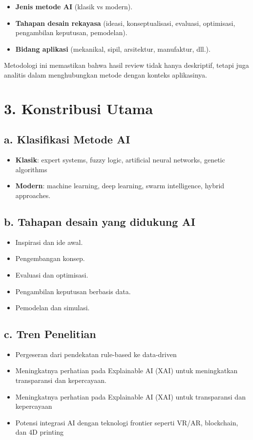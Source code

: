 \documentclass{article}
\begin{document}
\begin{itemize}
    \item \textbf{Jenis metode AI} (klasik vs modern).
    \item \textbf{Tahapan desain rekayasa} (ideasi, konseptualisasi, evaluasi, optimisasi, pengambilan keputusan, pemodelan).
    \item \textbf{Bidang aplikasi} (mekanikal, sipil, arsitektur, manufaktur, dll.).
\end{itemize} 
Metodologi ini memastikan bahwa hasil review tidak hanya deskriptif, tetapi juga analitis dalam menghubungkan metode dengan konteks aplikasinya.

\section*{3. Konstribusi Utama}
\subsection*{a. Klasifikasi Metode AI}
\begin{itemize}
    \item \textbf{Klasik}: expert systems, fuzzy logic, artificial neural networks, genetic algorithms
    \item \textbf{Modern}: machine learning, deep learning, swarm intelligence, hybrid approaches.
\end{itemize}
\subsection*{b. Tahapan desain yang didukung AI}
\begin{itemize}
    \item Inspirasi dan ide awal.
    \item Pengembangan konsep.
    \item Evaluasi dan optimisasi.
    \item Pengambilan keputusan berbasis data.
    \item Pemodelan dan simulasi.
\end{itemize}
\subsection*{c. Tren Penelitian}
\begin{itemize}
    \item Pergeseran dari pendekatan rule-based ke data-driven 
    \item Meningkatnya perhatian pada Explainable AI (XAI) untuk meningkatkan transparansi dan kepercayaan.
    \item Meningkatnya perhatian pada Explainable AI (XAI) untuk transparansi dan kepercayaan
    \item Potensi integrasi AI dengan teknologi frontier seperti VR/AR, blockchain, dan 4D printing
\end{itemize}
\end{document}
